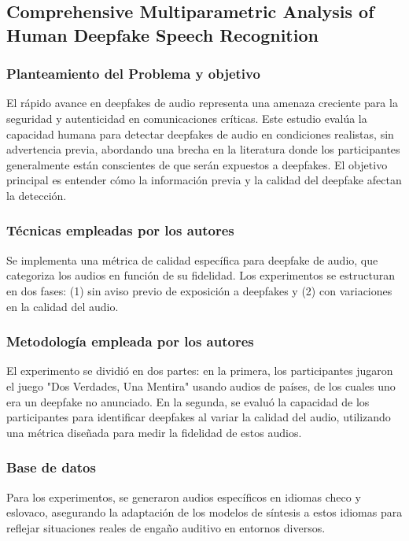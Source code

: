 \subsection{Comprehensive Multiparametric Analysis of Human Deepfake Speech Recognition \citep*{pr_dehghani2018copper}}

\subsubsection{Planteamiento del Problema y objetivo }
El rápido avance en deepfakes de audio representa una amenaza creciente para la seguridad y autenticidad en comunicaciones críticas. Este estudio evalúa la capacidad humana para detectar deepfakes de audio en condiciones realistas, sin advertencia previa, abordando una brecha en la literatura donde los participantes generalmente están conscientes de que serán expuestos a deepfakes. El objetivo principal es entender cómo la información previa y la calidad del deepfake afectan la detección.

\subsubsection{Técnicas empleadas por los autores}
Se implementa una métrica de calidad específica para deepfake de audio, que categoriza los audios en función de su fidelidad. Los experimentos se estructuran en dos fases: (1) sin aviso previo de exposición a deepfakes y (2) con variaciones en la calidad del audio.

\subsubsection{Metodología empleada por los autores}
El experimento se dividió en dos partes: en la primera, los participantes jugaron el juego "Dos Verdades, Una Mentira" usando audios de países, de los cuales uno era un deepfake no anunciado. En la segunda, se evaluó la capacidad de los participantes para identificar deepfakes al variar la calidad del audio, utilizando una métrica diseñada para medir la fidelidad de estos audios.

\subsubsection{Base de datos}
Para los experimentos, se generaron audios específicos en idiomas checo y eslovaco, asegurando la adaptación de los modelos de síntesis a estos idiomas para reflejar situaciones reales de engaño auditivo en entornos diversos.


